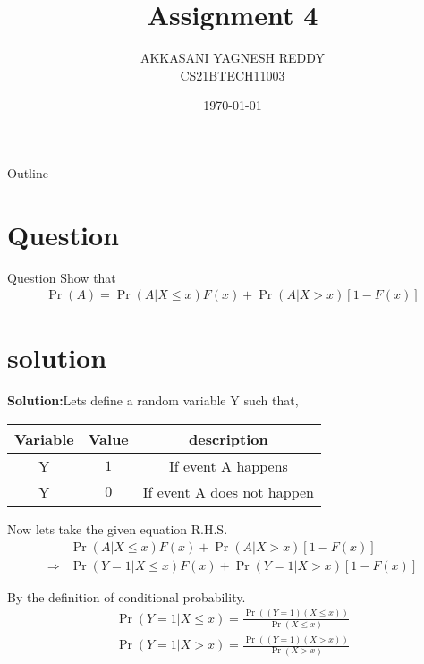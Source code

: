 \documentclass{beamer}
\title{Assignment 4}
\author{AKKASANI YAGNESH REDDY \\
     CS21BTECH11003 }
\date{\today}
\providecommand{\pr}[1]{\ensuremath{\Pr\left(#1\right)}}
\begin{document}
     \begin{frame}
     \maketitle    
     \end{frame}
     
     \logo{}
     
     \begin{frame}{Outline}
    \tableofcontents
     \end{frame}
     
     \section{Question}
     \begin{frame}{Question}
Show that
     \begin{align}
         \pr{A}=\pr{A|X\leq x}F(x)+\pr{A|X>x}[1-F(x)]
         \end{align}         
     \end{frame}
     
    \section{solution}
    \begin{frame}
        \textbf{Solution:}Lets define a random variable Y such that,
\begin{table}[h!]
    \begin{tabular}{|c|c|c|} \hline
    \textbf{Variable} & \textbf{Value} & \textbf{description} \\ \hline
    Y  & $1$ & If event A happens \\ \hline
    Y  & $0$ & If event A does not happen \\ \hline
    \end{tabular}
    \end{table}
    \end{frame}
    
    \begin{frame}
        Now lets take the given equation R.H.S.
\begin{align}
         &\pr{A|X\leq x}F(x)+\pr{A|X>x}[1-F(x)]\\
         \Rightarrow &\pr{Y=1|X\leq x}F(x)+\pr{Y=1|X>x}[1-F(x)]
 \end{align}
 \end{frame}
 \begin{frame}
By the definition of conditional probability.\\
\begin{align}
    \pr{Y=1|X\leq x}=\frac{\pr{(Y=1)(X\leq x)}}{\pr{X\leq x}} \\
    \pr{Y=1|X>x}=\frac{\pr{(Y=1)(X>x)}}{\pr{X>x}}
\end{align}
    \end{frame}
    
\end{document}
